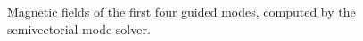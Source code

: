 \begin{figure}[htbp]
  \begin{center}
  \end{center}
  \caption{Magnetic fields of the first four guided modes, computed by
    the semivectorial mode solver.}
  \label{fig:wmm1_stern}
\end{figure}  

